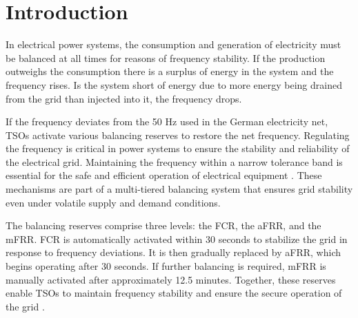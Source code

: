 \documentclass[class=scrbook, crop=false]{standalone}
\begin{document}
\chapter{Introduction}
\label{Chapter::Introduction}

In electrical power systems, the consumption and generation of electricity must be balanced at all times for reasons of frequency stability\cite{weitemeyerIntegrationRenewableEnergy2015}. If the production outweighs the consumption there is a surplus of energy in the system and the frequency rises. Is the system short of energy due to more energy being drained from the grid than injected into it, the frequency drops.

If the frequency deviates from the 50 Hz used in the German electricity net, \gls{TSO}s activate various balancing reserves to restore the net frequency.
Regulating the frequency is critical in power systems to ensure the stability and reliability of the electrical grid.
Maintaining the frequency within a narrow tolerance band is essential for the safe and efficient operation of electrical equipment \cite{balazsShorttermSystemImbalance2024}.
These mechanisms are part of a multi-tiered balancing system that ensures grid stability even under volatile supply and demand conditions.


The balancing reserves comprise three levels: the \gls{FCR}, the \gls{aFRR}, and the \gls{mFRR}.
\gls{FCR} is automatically activated within 30 seconds to stabilize the grid in response to frequency deviations. It is then gradually replaced by \gls{aFRR}, which begins operating after 30 seconds. If further balancing is required, \gls{mFRR} is manually activated after approximately 12.5 minutes.
Together, these reserves enable \gls{TSO}s to maintain frequency stability and ensure the secure operation of the grid \cite{FrequencyReserves}.

\end{document}
